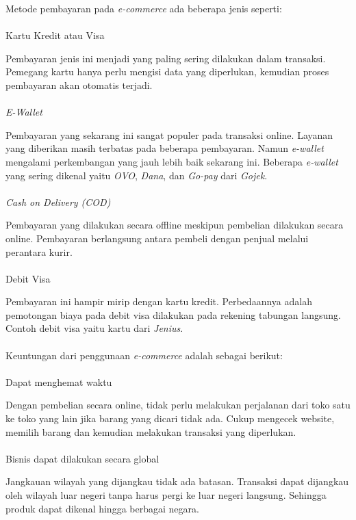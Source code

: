 \par Metode pembayaran pada \textit{e-commerce} ada beberapa jenis seperti:	\\\\
Kartu Kredit atau Visa\\
\par Pembayaran jenis ini menjadi yang paling sering dilakukan dalam transaksi. Pemegang kartu hanya perlu mengisi data yang diperlukan, kemudian proses pembayaran akan otomatis terjadi. \\\\
\textit{E-Wallet}\\
\par Pembayaran yang sekarang ini sangat populer pada transaksi online. Layanan yang diberikan masih terbatas pada beberapa pembayaran. Namun \textit{e-wallet} mengalami perkembangan yang jauh lebih baik sekarang ini. Beberapa \textit{e-wallet} yang sering dikenal yaitu \textit{OVO}, \textit{Dana}, dan \textit{Go-pay} dari \textit{Gojek}. \\\\
\textit{Cash on Delivery (COD)}\\
\par Pembayaran yang dilakukan secara offline meskipun pembelian dilakukan secara online. Pembayaran berlangsung antara pembeli dengan penjual melalui perantara kurir. \\\\
Debit Visa\\
\par Pembayaran ini hampir mirip dengan kartu kredit. Perbedaannya adalah pemotongan biaya pada debit visa dilakukan pada rekening tabungan langsung. Contoh debit visa yaitu kartu dari \textit{Jenius}.\\\\
Keuntungan dari penggunaan \textit{e-commerce} adalah sebagai berikut:\\\\
Dapat menghemat waktu \\
\par Dengan pembelian secara online, tidak perlu melakukan perjalanan dari toko satu ke toko yang lain jika barang yang dicari tidak ada. Cukup mengecek website, memilih barang dan kemudian melakukan transaksi yang diperlukan. \\\\
Bisnis dapat dilakukan secara global \\
\par Jangkauan wilayah yang dijangkau tidak ada batasan. Transaksi dapat dijangkau oleh wilayah luar negeri tanpa harus pergi ke luar negeri langsung. Sehingga produk dapat dikenal hingga berbagai negara.\\\\
